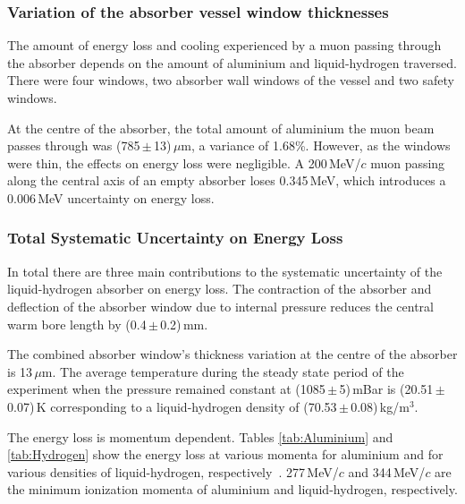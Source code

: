 \subsubsection{Variation of the absorber vessel window thicknesses}
\label{SubSect:Absorber_thickness}

The amount of energy loss and cooling experienced by a muon passing through the absorber depends on the amount of
aluminium and liquid-hydrogen traversed. There were four windows, two absorber wall windows of the vessel and two safety windows.

At the centre of the absorber, the total amount of aluminium the muon beam passes through was (785\,$\mathrm{\pm}$\,13)\,$\mu$m, a variance of 1.68\%. However, as the windows were thin, the effects on energy loss were negligible. A 200\,MeV/$c$ muon passing along the central axis of an empty absorber loses 0.345\,MeV, which introduces a 0.006\,MeV uncertainty on energy loss.


\subsubsection{Total Systematic Uncertainty on Energy Loss}
\label{SubSect:Absorber_total}

In total there are three main contributions to the systematic uncertainty of the liquid-hydrogen absorber on energy loss. The contraction of the absorber and deflection of the absorber window due to internal pressure reduces the central warm bore length by (0.4\,$\mathrm{\pm}$\,0.2)\,mm.

The combined absorber window's thickness variation at the centre of the absorber is 13\,$\mu$m. The average temperature during the steady state period of the experiment when the pressure remained constant at (1085\,$\mathrm{\pm}$\,5)\,mBar is (20.51\,$\mathrm{\pm}$\,0.07)\,K corresponding to a liquid-hydrogen density of (70.53\,$\mathrm{\pm}$\,0.08)\,kg/m$^{3}$.

The energy loss is momentum dependent. Tables \ref{tab:Aluminium} and \ref{tab:Hydrogen} show the energy loss at various momenta for aluminium and for various densities of liquid-hydrogen, respectively~\cite{AtomicAluminium}\cite{AtomicHydrogen}\cite{MuonAluminium}\cite{MuonliquidHydrogen}.
277\,MeV/$c$ and 344\,MeV/$c$ are the minimum ionization momenta of aluminium and liquid-hydrogen, respectively.


